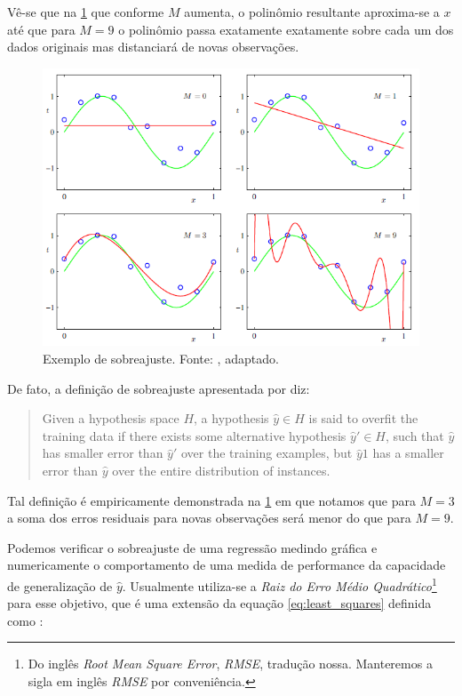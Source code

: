 Vê-se que na \cref{fig:bishop_overfitting} que conforme $ M $ aumenta, o polinômio resultante aproxima-se a $ x $ até que para $ M=9 $ o polinômio passa exatamente exatamente sobre cada um dos dados originais mas distanciará de novas observações. 

\begin{figure}[h!]
\centering
\includegraphics[width=1\linewidth]{img/bishop_overfitting}
\caption[Exemplo de sobreajuste.]{Exemplo de sobreajuste. Fonte: \cite[p.7]{Bishop}, adaptado.}
\label{fig:bishop_overfitting}
\end{figure}

De fato, a definição de sobreajuste apresentada por \cite[p.67, adaptado]{Mitchell} diz:

\begin{quotation}
Given a hypothesis space $ H $, a hypothesis $ \hat{y} \in H $ is said to overfit the training data if there exists some alternative hypothesis $ \hat{y}' \in H $, such that $ \hat{y} $ has smaller error than $ \hat{y}' $ over the training examples, but $ \hat{y}1 $ has a smaller error than $ \hat{y} $ over the entire distribution of instances.
\end{quotation}

Tal definição é empiricamente demonstrada na \cref{fig:bishop_overfitting} em que notamos que para $ M=3 $ a soma dos erros residuais para novas observações será menor do que para $ M=9 $.

Podemos verificar o sobreajuste de uma regressão medindo gráfica e numericamente o comportamento de uma medida de performance da capacidade de generalização de $ \hat{y} $. Usualmente utiliza-se  a \textit{Raiz do Erro Médio Quadrático}\footnote{Do inglês \textit{Root Mean Square Error}, \textit{RMSE}, tradução nossa. Manteremos a sigla em inglês \textit{RMSE} por conveniência.} para esse objetivo,  que é uma extensão da equação \ref{eq:least_squares} definida como \cite[p.7, adaptado]{Bishop}:

